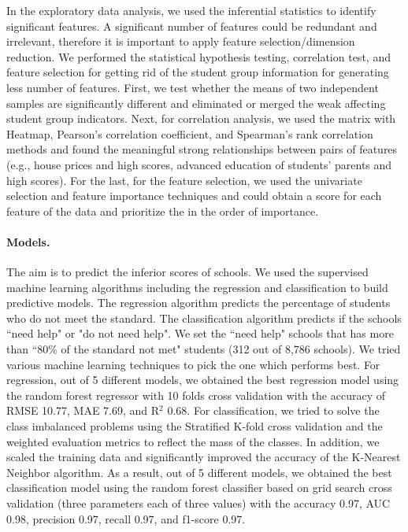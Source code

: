 \documentclass[11pt]{article}
\begin{document}
%
In the exploratory data analysis,
we used the inferential statistics to identify significant features.
%
%
A significant number of features could be redundant and irrelevant, therefore it is important to apply feature selection/dimension reduction. We performed the statistical hypothesis testing, correlation test, and feature selection for getting rid of the student group information for generating less number of features.
%
First, we test whether the means of two independent samples are significantly different and eliminated or merged the weak affecting
student group indicators.
%
Next, for correlation analysis, we used the matrix with Heatmap, Pearson's correlation coefficient, and Spearman's rank correlation methods and found the meaningful strong relationships between pairs of features (e.g., house prices and high scores, advanced education of students' parents and high scores). 
%
For the last, for the feature selection, we used the univariate selection and feature importance techniques and could obtain a score for each feature of the data and prioritize the in the order of importance.

\paragraph*{Models.}
The aim is to predict the inferior scores of schools. We used the supervised machine learning  algorithms including the regression and classification to build predictive models.
The regression algorithm predicts the percentage of students who do not meet the standard. The classification algorithm predicts if the schools ``need help" or "do not need help". 
%
We set the ``need help" schools that has more than ``80\% of the standard not met" students (312 out of 8,786 schools).
%
We tried various machine learning techniques to pick the one which performs best.
%
For regression, out of 5 different models, we obtained the best regression model using the random forest regressor with 10 folds cross validation
with the accuracy of RMSE 10.77, MAE 7.69, and R$^{2}$ 0.68.
%
For classification, we tried to solve the class imbalanced problems using the Stratified K-fold cross validation and the weighted evaluation metrics to reflect the mass of the classes. In addition, we scaled the training data and significantly improved the accuracy of the K-Nearest Neighbor algorithm.
%
As a result, out of 5 different models, we obtained the best classification model using the random forest classifier based on grid search cross validation (three parameters each of three values)
with the accuracy 0.97, AUC 0.98, precision 0.97, recall 0.97, and f1-score 0.97. 
\end{document}
